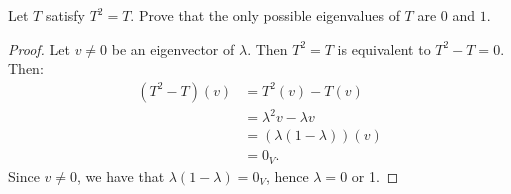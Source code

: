 \documentclass[10pt,twoside,openany]{memoir}
\begin{document}
        \begin{exercise}
            Let $T$ satisfy $T^2 = T$. Prove that the only possible eigenvalues of $T$ are $0$ and $1$.
        \end{exercise}
            \begin{proof}
                Let $v\neq 0$ be an eigenvector of $\lambda$. Then $T^2 = T$ is equivalent to $T^2 - T = 0$. Then:
                    \begin{equation*}
                    \begin{split}
                        (T^2 - T)(v)
                        & = T^2(v) - T(v) \\
                        & = \lambda^2v - \lambda v \\
                        & = (\lambda(1 - \lambda))(v) \\
                        & = 0_V.
                    \end{split}
                    \end{equation*}
                Since $v \neq 0$, we have that $\lambda(1-\lambda) = 0_V$, hence $\lambda = 0$ or 1.
            \end{proof}
\end{document}
